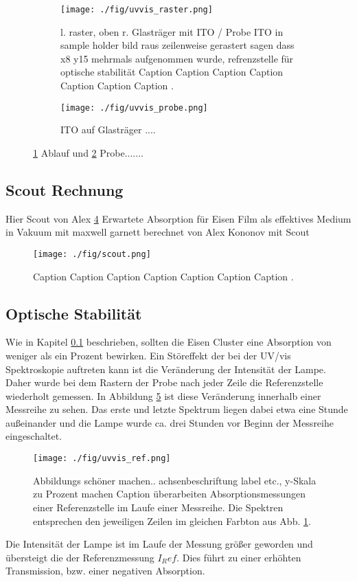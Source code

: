 \begin{figure}
    \begin{subfigure}[t]{0.65\textwidth}
      \texttt{[image: ./fig/uvvis\_raster.png]}
      \caption{l. raster, oben r. Glasträger mit ITO / Probe ITO in sample holder bild raus
      zeilenweise gerastert sagen dass x8 y15 mehrmals aufgenommen wurde, refrenzstelle für optische stabilität    Caption Caption Caption Caption Caption Caption Caption .}
      \label{fig:uvvis_raster}
    \end{subfigure}\hfill
    \begin{subfigure}[t]{0.325\textwidth}
      \texttt{[image: ./fig/uvvis\_probe.png]}
      \caption{ITO auf Glasträger ....}
      \label{fig:uvvis_probe}
    \end{subfigure}
    \caption{\ref{fig:uvvis_raster} Ablauf und \ref{fig:uvvis_probe} Probe.......} 
    \label{fig:uvvis_ablauf}
\end{figure}

\subsection{Scout Rechnung}
\label{sec:scoutsim}
Hier Scout von Alex \ref{fig:scout}
Erwartete Absorption für Eisen Film als effektives Medium in Vakuum mit maxwell garnett \cite{Thei.1993} berechnet von Alex Kononov mit Scout

\begin{figure}
    \centering
    \texttt{[image: ./fig/scout.png]}
    \caption{Caption Caption Caption Caption Caption Caption Caption .}
    \label{fig:scout}
\end{figure}

\subsection{Optische Stabilität}
Wie in Kapitel \ref{sec:scoutsim} beschrieben, sollten die Eisen Cluster eine Absorption von weniger als ein Prozent bewirken.
Ein Störeffekt der bei der UV/vis Spektroskopie auftreten kann ist die Veränderung der Intensität der Lampe. 
Daher wurde bei dem Rastern der Probe nach jeder Zeile die Referenzstelle wiederholt gemessen.
In Abbildung \ref{fig:uvvis_ref} ist diese Veränderung innerhalb einer Messreihe zu sehen.
Das erste und letzte Spektrum liegen dabei etwa eine Stunde außeinander und die Lampe wurde ca. drei Stunden vor Beginn der Messreihe eingeschaltet.
\begin{figure}
    \centering
    \texttt{[image: ./fig/uvvis\_ref.png]}
    \caption{Abbildungs schöner machen.. achsenbeschriftung label etc., y-Skala zu Prozent machen Caption überarbeiten
    Absorptionsmessungen einer Referenzstelle im Laufe einer Messreihe.
    Die Spektren entsprechen den jeweiligen Zeilen im gleichen Farbton aus Abb. \ref{fig:uvvis_raster}.}
    \label{fig:uvvis_ref}
\end{figure}
Die Intensität der Lampe ist im Laufe der Messung größer geworden und übersteigt die der Referenzmessung $I_Ref$. 
Dies führt zu einer erhöhten Transmission, bzw. einer negativen Absorption.

